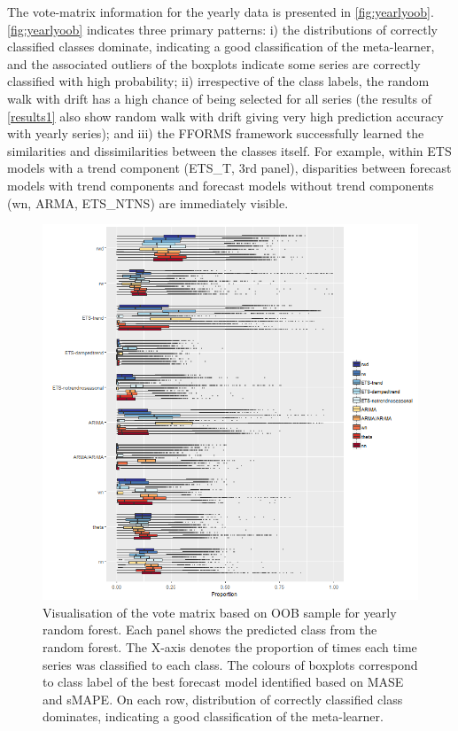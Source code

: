 \documentclass[11pt,a4paper,]{article}
\begin{document}
The vote-matrix information for the yearly data is presented in \autoref{fig:yearlyoob}. \autoref{fig:yearlyoob} indicates three primary patterns: i) the distributions of correctly classified classes dominate, indicating a good classification of the meta-learner, and the associated outliers of the boxplots indicate some series are correctly classified with high probability; ii) irrespective of the class labels, the random walk with drift has a high chance of being selected for all series (the results of \autoref{results1} also show random walk with drift giving very high prediction accuracy with yearly series); and iii) the FFORMS framework successfully learned the similarities and dissimilarities between the classes itself. For example, within ETS models with a trend component (ETS\_T, 3rd panel), disparities between forecast models with trend components and forecast models without trend components (wn, ARMA, ETS\_NTNS) are immediately visible.

\begin{figure}
\centering
\includegraphics{figures/yearlyoob-1.png}
\caption{\label{fig:yearlyoob}Visualisation of the vote matrix based on OOB sample for yearly random forest. Each panel shows the predicted class from the random forest. The X-axis denotes the proportion of times each time series was classified to each class. The colours of boxplots correspond to class label of the best forecast model identified based on MASE and sMAPE. On each row, distribution of correctly classified class dominates, indicating a good classification of the meta-learner.}
\end{figure}
\end{document}

